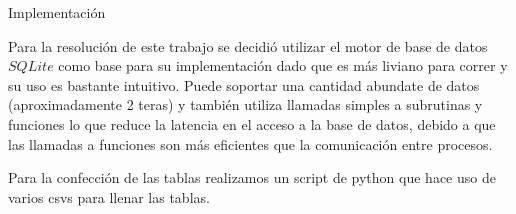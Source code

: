 \begin{section}{Implementaci\'on}

Para la resoluci\'on de este trabajo se decidi\'o utilizar el motor de base de datos $SQLite$ como base para su implementaci\'on dado que es m\'as liviano para correr y su uso es bastante intuitivo. Puede soportar una cantidad abundate de datos (aproximadamente 2 teras) y tambi\'en utiliza llamadas simples a subrutinas y funciones lo que reduce la latencia en el acceso a la base de datos, debido a que las llamadas a funciones son más eficientes que la comunicación entre procesos. 

Para la confecci\'on de las tablas realizamos un script de python que hace uso de varios csvs para llenar las tablas. 

\begin{lstlisting}[language=SQL]



\end{lstlisting} 

\end{section}

